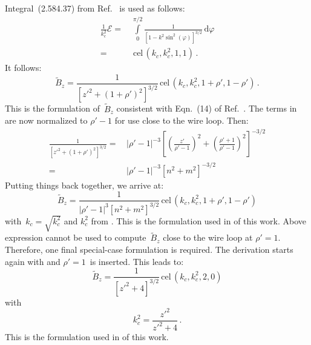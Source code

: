 Integral~(2.584.37) from Ref.~\cite{gradshteyn_ryzhik} is used as follows:
\begin{align}
  \frac{1}{k_c^2} \mathcal{E}
 =&\, \int\limits_0^{\pi/2}
        \frac{1}{\left[ 1 - k^2 \sin^2(\varphi) \right]^{3/2}}
        \,\mathrm{d}\varphi \nonumber \\
 =&\, \,\textrm{cel}\,(k_c, k_c^2, 1, 1) \, .
\end{align}
It follows:
\begin{equation}
  \tilde{B}_z
 = \frac{1}{\left[z'^2 + (1 + \rho')^2\right]^{3/2}} \,\textrm{cel}\,(k_c, k_c^2, 1 + \rho', 1 - \rho') \, . \label{eqn:cwl_B_z_14}
\end{equation}
This is the formulation of~$\tilde{B}_z$ consistent with Eqn.~(14) of Ref.~\cite{walstrom_2017}.
The terms in~ are now normalized to $\rho'-1$ for use close to the wire loop.
Then:
\begin{align}
  \frac{1}{\left[z'^2 + (1 + \rho')^2\right]^{3/2}}
 =&\, \left| \rho' - 1 \right|^{-3} \left[ \left(\frac{z'}{\rho'-1}\right)^2 + \left( \frac{\rho' + 1}{\rho'-1} \right)^2 \right]^{-3/2} \nonumber \\
 =&\, \left| \rho' - 1 \right|^{-3} \left[ n^2 + m^2 \right]^{-3/2}
\end{align}
Putting things back together, we arrive at:
\begin{equation}
  \tilde{B}_z
 = \frac{1}{\left| \rho' - 1 \right|^3 \left[ n^2 + m^2 \right]^{3/2} } \,\textrm{cel}\,(k_c, k_c^2, 1 + \rho', 1 - \rho') \label{eqn:cwl_B_z_n_derivation}
\end{equation}
with~$k_c = \sqrt{k_c^2}$ and $k_c^2$ from .
This is the formulation used in  of this work.
Above expression cannot be used to compute~$\tilde{B}_z$ close to the wire loop at $\rho'=1$.
Therefore, one final special-case formulation is required.
The derivation starts again with  and $\rho'=1$~is inserted.
This leads to:
\begin{equation}
  \tilde{B}_z = \frac{1}{\left[ z'^2 + 4 \right]^{3/2}} \,\textrm{cel}\,(k_c, k_c^2, 2, 0) \label{eqn:cwl_B_z_v_derivation}
\end{equation}
with
\begin{equation}
  k_c^2 = \frac{z'^2}{z'^2 + 4} \, .
\end{equation}
This is the formulation used in  of this work.

